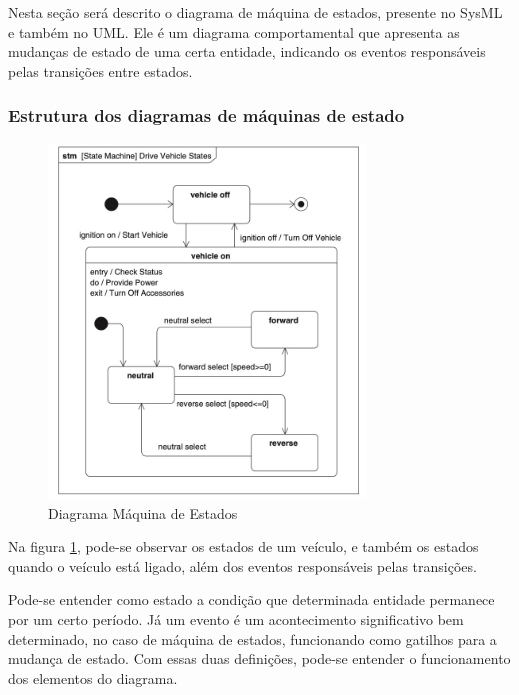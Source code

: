 Nesta seção será descrito o diagrama de máquina de estados, presente no SysML e também no UML. Ele é um diagrama comportamental que apresenta as mudanças de estado de uma certa entidade, indicando os eventos responsáveis pelas transições entre estados.


\subsubsection{Estrutura dos diagramas de máquinas de estado}
\begin{figure}[h]
\centering
\includegraphics[width=0.75\textwidth]{figures/diagrama-maquina-estados.jpeg}
\caption{Diagrama Máquina de Estados}
\label{fig:state_machine_diagram}
\end{figure}
Na figura \ref{fig:state_machine_diagram}, pode-se observar os estados de um veículo, e também os estados quando o veículo está ligado, além dos eventos responsáveis pelas transições. 

Pode-se entender como estado a condição que determinada entidade permanece por um certo período. Já um evento é um acontecimento significativo bem determinado, no caso de máquina de estados, funcionando como gatilhos para a mudança de estado. Com essas duas definições, pode-se entender o funcionamento dos elementos do diagrama.

